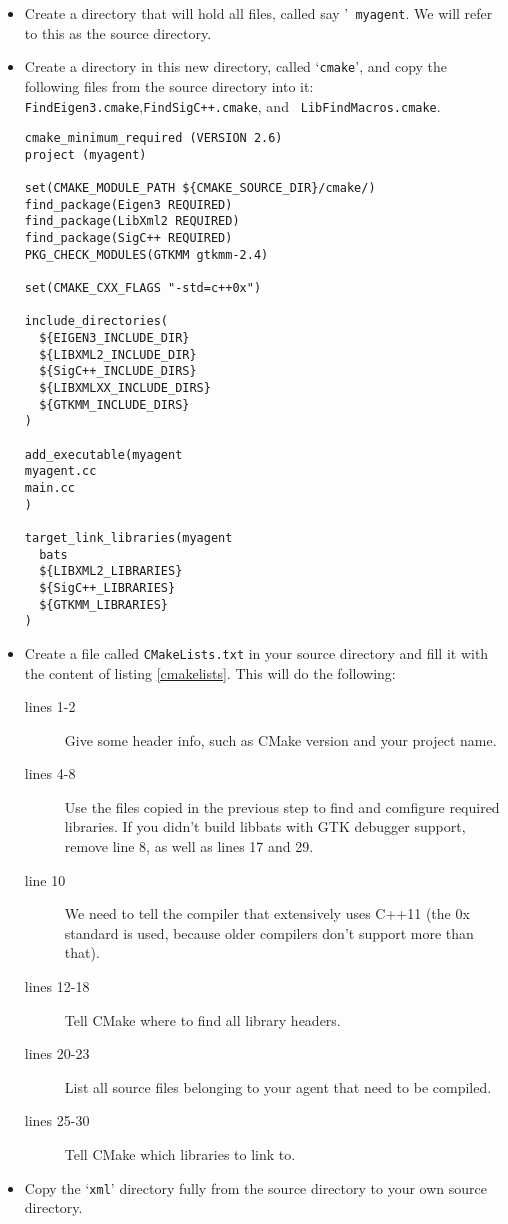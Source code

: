 \begin{itemize}
\item Create a directory that will hold all files, called say '{\tt
    myagent}. We will refer to this as the source directory.
\item Create a directory in this new directory, called `{\tt cmake}',
  and copy the following files from the \libbats source directory into
  it: {\tt FindEigen3.cmake},{\tt FindSigC++.cmake}, and {\tt
    LibFindMacros.cmake}.

\begin{lstlisting}[float,caption={\tt CMakeLists.txt},label=cmakelists,frame=single]
cmake_minimum_required (VERSION 2.6)
project (myagent)

set(CMAKE_MODULE_PATH ${CMAKE_SOURCE_DIR}/cmake/)
find_package(Eigen3 REQUIRED)
find_package(LibXml2 REQUIRED)
find_package(SigC++ REQUIRED)
PKG_CHECK_MODULES(GTKMM gtkmm-2.4)

set(CMAKE_CXX_FLAGS "-std=c++0x")

include_directories(
  ${EIGEN3_INCLUDE_DIR}
  ${LIBXML2_INCLUDE_DIR}
  ${SigC++_INCLUDE_DIRS}
  ${LIBXMLXX_INCLUDE_DIRS}
  ${GTKMM_INCLUDE_DIRS}
)

add_executable(myagent
myagent.cc
main.cc
)

target_link_libraries(myagent
  bats
  ${LIBXML2_LIBRARIES}
  ${SigC++_LIBRARIES}
  ${GTKMM_LIBRARIES}
)
\end{lstlisting}

\item Create a file called {\tt CMakeLists.txt} in your source
  directory and fill it with the content of listing \ref{cmakelists}. This will do the following:
  \begin{description}
  \item[lines 1-2] Give some header info, such as CMake version and your project name.
  \item[lines 4-8] Use the files copied in the previous step to find
    and comfigure required libraries. If you didn't build libbats with
    GTK debugger support, remove line 8, as well as lines 17 and 29.
  \item[line 10] We need to tell the compiler that \libbats
    extensively uses C++11 (the 0x standard is used, because older
    compilers don't support more than that).
  \item[lines 12-18] Tell CMake where to find all library headers.
  \item[lines 20-23] List all source files belonging to your agent
    that need to be compiled.
  \item[lines 25-30] Tell CMake which libraries to link to.
  \end{description}
\item Copy the `{\tt xml}' directory fully from the \libbats source
  directory to your own source directory.
\end{itemize}

